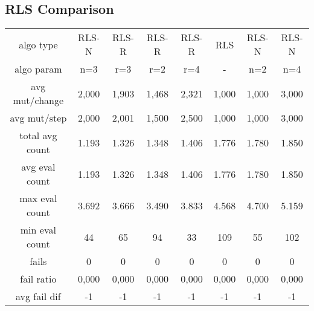\subsection{RLS Comparison}

\begin{tabular}[h]{cccccccc}
algo type&            RLS-N&     RLS-R&     RLS-R&     RLS-R&       RLS&     RLS-N&     RLS-N\\
algo param&             n=3&       r=3&       r=2&       r=4&         -&       n=2&       n=4\\
avg mut/change&       2,000&     1,903&     1,468&     2,321&     1,000&     1,000&     3,000\\
avg mut/step&         2,000&     2,001&     1,500&     2,500&     1,000&     1,000&     3,000\\
\hline
total avg count&      1.193&     1.326&     1.348&     1.406&     1.776&     1.780&     1.850\\
avg eval count&       1.193&     1.326&     1.348&     1.406&     1.776&     1.780&     1.850\\
max eval count&       3.692&     3.666&     3.490&     3.833&     4.568&     4.700&     5.159\\
min eval count&          44&        65&        94&        33&       109&        55&       102\\
\hline
fails&                    0&         0&         0&         0&         0&         0&         0\\
fail ratio&           0,000&     0,000&     0,000&     0,000&     0,000&     0,000&     0,000\\
avg fail dif&            -1&        -1&        -1&        -1&        -1&        -1&        -1\\
\end{tabular}

